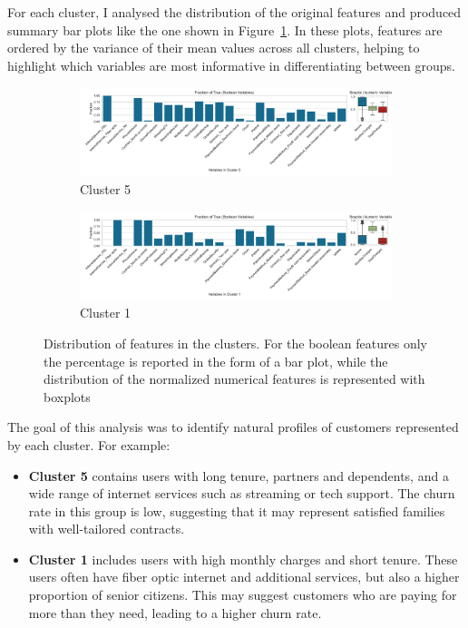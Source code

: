\documentclass[a4paper,11pt]{article}
\begin{document}
For each cluster, I analysed the distribution of the original features and produced summary bar plots like the one shown in Figure~\ref{fig:cluster_5}. In these plots, features are ordered by the variance of their mean values across all clusters, helping to highlight which variables are most informative in differentiating between groups.
\begin{figure}[h]
    \centering
    \begin{subfigure}{\linewidth}
        \includegraphics[width=\linewidth]{figures/clustering/cluster_5_clusters.pdf}
    \caption{Cluster 5}
    \label{fig:cluster_5}
    \end{subfigure}
    \begin{subfigure}{\linewidth}
        \includegraphics[width=\linewidth]{figures/clustering/cluster_1_clusters.pdf}
    \caption{Cluster 1}
    \label{fig:cluster_1}
    \end{subfigure}
    \caption{Distribution of features in the clusters. For the boolean features only the percentage is reported in the form of a bar plot, while the distribution of the normalized numerical features is represented with boxplots}
\end{figure}
The goal of this analysis was to identify natural profiles of customers represented by each cluster. For example:
\begin{itemize}
    \item \textbf{Cluster 5} contains users with long tenure, partners and dependents, and a wide range of internet services such as streaming or tech support. The churn rate in this group is low, suggesting that it may represent satisfied families with well-tailored contracts.
    \item \textbf{Cluster 1} includes users with high monthly charges and short tenure. These users often have fiber optic internet and additional services, but also a higher proportion of senior citizens. This may suggest customers who are paying for more than they need, leading to a higher churn rate.
\end{itemize}
\end{document}
